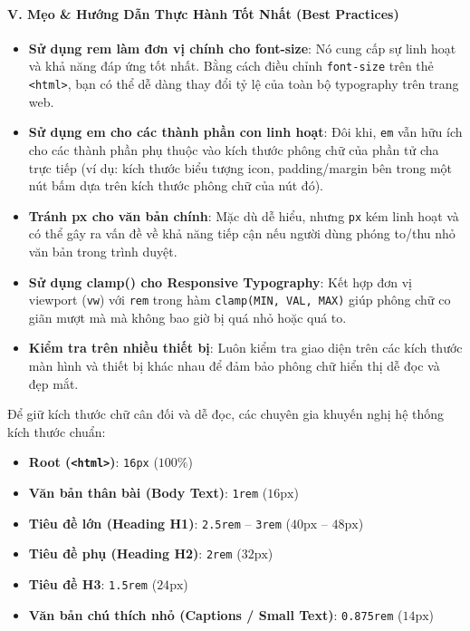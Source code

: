 \documentclass[11pt,oneside]{book}
\newcommand{\codeinline}[1]{\textcolor{accentOrange}{\texttt{#1}}}
\begin{document}
\paragraph*{V. Mẹo \& Hướng Dẫn Thực Hành Tốt Nhất (Best Practices)}
\begin{tipBox}
\begin{itemize}[leftmargin=1.5em, itemsep=4pt, parsep=0pt]
    \item \textbf{Sử dụng rem làm đơn vị chính cho font-size}: Nó cung cấp sự linh hoạt và khả năng đáp ứng tốt nhất. Bằng cách điều chỉnh \codeinline{font-size} trên thẻ \codeinline{<html>}, bạn có thể dễ dàng thay đổi tỷ lệ của toàn bộ typography trên trang web.
    \item \textbf{Sử dụng em cho các thành phần con linh hoạt}: Đôi khi, \codeinline{em} vẫn hữu ích cho các thành phần phụ thuộc vào kích thước phông chữ của phần tử cha trực tiếp (ví dụ: kích thước biểu tượng icon, padding/margin bên trong một nút bấm dựa trên kích thước phông chữ của nút đó).
    \item \textbf{Tránh px cho văn bản chính}: Mặc dù dễ hiểu, nhưng \codeinline{px} kém linh hoạt và có thể gây ra vấn đề về khả năng tiếp cận nếu người dùng phóng to/thu nhỏ văn bản trong trình duyệt.
    \item \textbf{Sử dụng clamp() cho Responsive Typography}: Kết hợp đơn vị viewport (\codeinline{vw}) với \codeinline{rem} trong hàm \codeinline{clamp(MIN, VAL, MAX)} giúp phông chữ co giãn mượt mà mà không bao giờ bị quá nhỏ hoặc quá to.
    \item \textbf{Kiểm tra trên nhiều thiết bị}: Luôn kiểm tra giao diện trên các kích thước màn hình và thiết bị khác nhau để đảm bảo phông chữ hiển thị dễ đọc và đẹp mắt.
\end{itemize}
\end{tipBox}

\begin{conceptBox}
Để giữ kích thước chữ cân đối và dễ đọc, các chuyên gia khuyến nghị hệ thống kích thước chuẩn:
\begin{itemize}[leftmargin=1.5em, itemsep=3pt, parsep=0pt]
    \item \textbf{Root (\codeinline{<html>})}: \codeinline{16px} ($100\%$)
    \item \textbf{Văn bản thân bài (Body Text)}: \codeinline{1rem} ($16\text{px}$)
    \item \textbf{Tiêu đề lớn (Heading H1)}: \codeinline{2.5rem} -- \codeinline{3rem} ($40\text{px}$ -- $48\text{px}$)
    \item \textbf{Tiêu đề phụ (Heading H2)}: \codeinline{2rem} ($32\text{px}$)
    \item \textbf{Tiêu đề H3}: \codeinline{1.5rem} ($24\text{px}$)
    \item \textbf{Văn bản chú thích nhỏ (Captions / Small Text)}: \codeinline{0.875rem} ($14\text{px}$)
\end{itemize}
\end{conceptBox}
\end{document}
